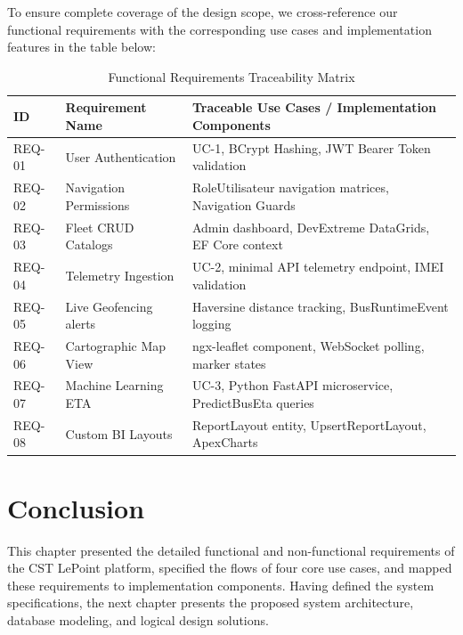 To ensure complete coverage of the design scope, we cross-reference our functional requirements with the corresponding use cases and implementation features in the table below:

\begin{table}[H]
  \small
  \centering
  \begin{tabularx}{\textwidth}{lXX}
    \toprule
    \textbf{ID} & \textbf{Requirement Name} & \textbf{Traceable Use Cases / Implementation Components} \\
    \midrule
    REQ-01 & User Authentication & UC-1, BCrypt Hashing, JWT Bearer Token validation \\
    REQ-02 & Navigation Permissions & RoleUtilisateur navigation matrices, Navigation Guards \\
    REQ-03 & Fleet CRUD Catalogs & Admin dashboard, DevExtreme DataGrids, EF Core context \\
    REQ-04 & Telemetry Ingestion & UC-2, minimal API telemetry endpoint, IMEI validation \\
    REQ-05 & Live Geofencing alerts & Haversine distance tracking, BusRuntimeEvent logging \\
    REQ-06 & Cartographic Map View & ngx-leaflet component, WebSocket polling, marker states \\
    REQ-07 & Machine Learning ETA & UC-3, Python FastAPI microservice, PredictBusEta queries \\
    REQ-08 & Custom BI Layouts & ReportLayout entity, UpsertReportLayout, ApexCharts \\
    \bottomrule
  \end{tabularx}
  \caption{Functional Requirements Traceability Matrix}
  \label{tab:traceability_matrix}
\end{table}

\section{Conclusion}

This chapter presented the detailed functional and non-functional requirements of the CST LePoint platform, specified the flows of four core use cases, and mapped these requirements to implementation components. Having defined the system specifications, the next chapter presents the proposed system architecture, database modeling, and logical design solutions.
